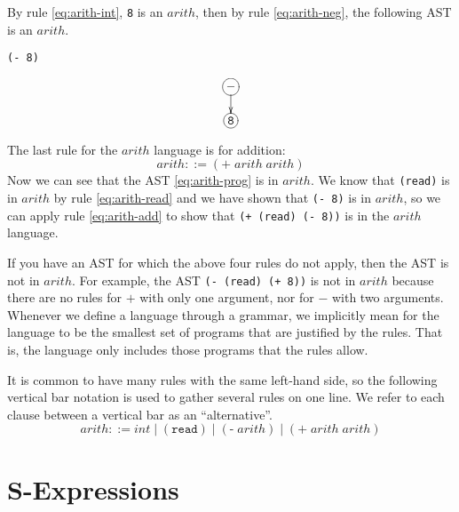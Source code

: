 \documentclass[12pt]{book}
\newcommand{\itm}[1]{\ensuremath{\mathit{#1}}}
\newcommand{\Int}{\itm{int}}
\newcommand{\key}[1]{\texttt{#1}}
\begin{document}
By rule \eqref{eq:arith-int}, \texttt{8} is an $\itm{arith}$, then by
rule \eqref{eq:arith-neg}, the following AST is an $\itm{arith}$.
\begin{center}
\begin{minipage}{0.25\textwidth}
\begin{lstlisting}
(- 8)
\end{lstlisting}
\end{minipage}
\begin{minipage}{0.25\textwidth}
\begin{equation}
\xymatrix@=15pt{
 *+[Fo]{-} \ar[d] \\
 *+[Fo]{\tt 8} 
}
\label{eq:arith-neg8}
\end{equation}
\end{minipage}
\end{center}

The last rule for the $\itm{arith}$ language is for addition:
\begin{equation}
  \itm{arith} ::= (\key{+} \; \itm{arith} \; \itm{arith}) \label{eq:arith-add}
\end{equation}
Now we can see that the AST \eqref{eq:arith-prog} is in $\itm{arith}$.
We know that \lstinline{(read)} is in $\itm{arith}$ by rule
\eqref{eq:arith-read} and we have shown that \texttt{(- 8)} is in
$\itm{arith}$, so we can apply rule \eqref{eq:arith-add} to show that
\texttt{(+ (read) (- 8))} is in the $\itm{arith}$ language.

If you have an AST for which the above four rules do not apply, then
the AST is not in $\itm{arith}$. For example, the AST \texttt{(- (read)
  (+ 8))} is not in $\itm{arith}$ because there are no rules for $+$
with only one argument, nor for $-$ with two arguments.  Whenever we
define a language through a grammar, we implicitly mean for the
language to be the smallest set of programs that are justified by the
rules. That is, the language only includes those programs that the
rules allow.

It is common to have many rules with the same left-hand side, so the
following vertical bar notation is used to gather several rules on one
line.  We refer to each clause between a vertical bar as an
``alternative''.
\[
\itm{arith} ::= \Int \mid (\key{read}) \mid (\key{-} \; \itm{arith}) \mid
   (\key{+} \; \itm{arith} \; \itm{arith}) 
\]

\section{S-Expressions}
\label{sec:s-expr}
\end{document}

